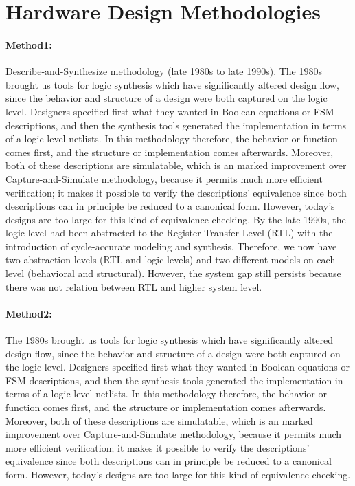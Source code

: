 \section{Hardware Design Methodologies}

\paragraph{Method1:} Describe-and-Synthesize methodology (late 1980s to late 1990s).
The 1980s brought us tools for logic synthesis which have significantly altered design flow, since the behavior and structure of a design were both captured on the logic level.
Designers specified first what they wanted in Boolean equations or FSM descriptions, and then the synthesis tools generated the implementation in terms of a logic-level netlists.
In this methodology therefore, the behavior or function comes first, and the structure or implementation comes afterwards.
Moreover, both of these descriptions are simulatable, which is an marked improvement over Capture-and-Simulate methodology, because it permits much more efficient verification; it makes it possible to verify the descriptions’ equivalence since both descriptions can in principle be reduced to a canonical form.
However, today’s designs are too large for this kind of equivalence checking.
By the late 1990s, the logic level had been abstracted to the Register-Transfer Level (RTL) with the introduction of cycle-accurate modeling and synthesis.
Therefore, we now have two abstraction levels (RTL and logic levels) and two different models on each level (behavioral and structural).
However, the system gap still persists because there was not relation between RTL and higher system level.

\paragraph{Method2:}  The 1980s brought us tools for logic synthesis which have significantly altered design flow, since the behavior and structure of a design were both captured on the logic level.
Designers specified first what they wanted in Boolean equations or FSM descriptions, and then the synthesis tools generated the implementation in terms of a logic-level netlists.
In this methodology therefore, the behavior or function comes first, and the structure or implementation comes afterwards.
Moreover, both of these descriptions are simulatable, which is an marked improvement over Capture-and-Simulate methodology, because it permits much more efficient verification; it makes it possible to verify the descriptions’ equivalence since both descriptions can in principle be reduced to a canonical form.
However, today’s designs are too large for this kind of equivalence checking.

